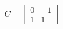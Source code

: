 \documentclass[preview]{standalone}
\begin{document}
\begin{align*}
C = \begin{bmatrix} 0 & -1 \\ 1 & 1 \end{bmatrix}
\end{align*}
\end{document}
